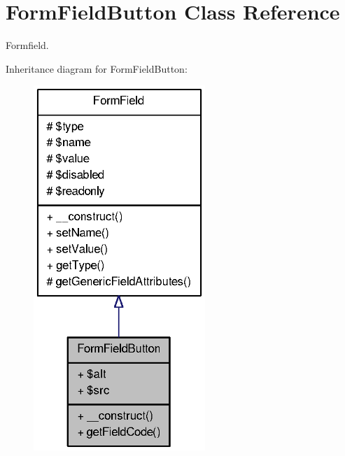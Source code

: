 \section{FormFieldButton Class Reference}
\label{classFormFieldButton}


Formfield.  




Inheritance diagram for FormFieldButton:\nopagebreak
\begin{figure}[H]
\begin{center}
\leavevmode
\includegraphics[width=184pt]{classFormFieldButton__inherit__graph}
\end{center}
\end{figure}


